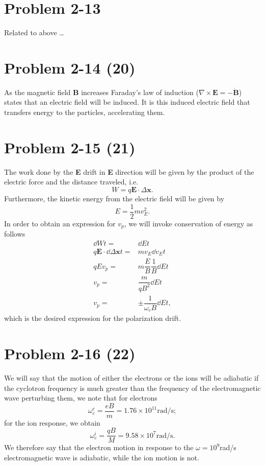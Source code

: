 \section*{Problem 2-13}
\label{sec:2-13}
Related to above \dots

\section*{Problem 2-14 (20)}
\label{sec:2-14}
As the magnetic field \textbf{B} increases Faraday's law of induction (\(\nabla \times \textbf{E} = -\dot{\textbf{B}} \)) states that an electric field will be induced. It is this induced electric field that transfers energy to the particles, accelerating them. 

\section*{Problem 2-15 (21)}
\label{sec:2-15}
The work done by the \textbf{E} drift in \textbf{E} direction will be given by the product of the electric force and the distance traveled, i.e.
\begin{equation}
	W = q\textbf{E}\cdot\Delta\textbf{x}.
\end{equation}
Furthermore, the kinetic energy from the electric field will be given by
\begin{equation}
	E = \dfrac{1}{2}mv_E^2.
\end{equation}
In order to obtain an expression for \(v_p\), we will invoke conservation of energy as follows
\begin{align}
	\dd{W}{t} =& \dd{E}{t}\\
	q\textbf{E}\cdot\dd{\Delta\textbf{x}}{t} =& mv_E\dd{v_E}{t} \\
	qEv_p =& m\dfrac{E}{B}\dfrac{1}{B}\dd{E}{t} \\
	v_p =& \dfrac{m}{qB^2}\dd{E}{t} \\
	v_p =& \pm\dfrac{1}{\omega_cB}\dd{E}{t},
\end{align}
which is the desired expression for the polarization drift.

\section*{Problem 2-16 (22)}
\label{sec:2-16}
We will say that the motion of either the electrons or the ions will be adiabatic if the cyclotron frequency is much greater than the frequency of the electromagnetic wave perturbing them, we note that for electrons
\begin{equation*}
	\omega_c^e = \dfrac{eB}{m} = 1.76 \times 10^{11} \text{rad/s};
\end{equation*}
for the ion response, we obtain
\begin{equation*}
	\omega_c^i = \dfrac{qB}{M} = 9.58 \times 10^{7} \text{rad/s}.
\end{equation*}
We therefore say that the electron motion in response to the \(\omega = 10^9\)rad/s electromagnetic wave is adiabatic, while the ion motion is not.

